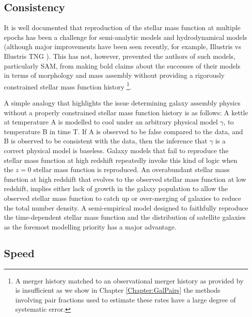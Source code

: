 \subsection{Consistency}
It is well documented that reproduction of the stellar mass function at multiple epochs has been a challenge for semi-analytic models \cite{Knebe2018CosmicModels, Asquith2018CosmicModels} and hydrodynamical models (although major improvements have been seen recently, for example, Illustris vs Illustris TNG \cite{Nelson2015TheRelease, Nelson2019TheRelease}). This has not, however, prevented the authors of such models, particularly SAM, from making bold claims about the successes of their models in terms of morphology and mass assembly without providing a rigorously constrained stellar mass function history \cite[e.g.][]{Somerville2008ANuclei, Hopkins2010MERGERSMATTER}\footnote{A merger history matched to an observational merger history as provided by \citet{Hopkins2010MERGERSMATTER} is insufficient as we show in Chapter \ref{Chapter:GalPairs} the methods involving pair fractions used to estimate these rates have a large degree of systematic error.}. 

A simple analogy that highlights the issue determining galaxy assembly physics without a properly constrained stellar mass function history is as follows: A kettle at temperature A is modelled to cool under an arbitrary physical model $\gamma$, to temperature B in time T. If A is observed to be false compared to the data, and B is observed to be consistent with the data, then the inference that $\gamma$ is a correct physical model is baseless. Galaxy models that fail to reproduce the stellar mass function at high redshift repeatedly invoke this kind of logic when the $z=0$ stellar mass function is reproduced. An overabundant stellar mass function at high redshift that evolves to the observed stellar mass function at low redshift, implies either lack of growth in the galaxy population to allow the observed stellar mass function to catch up or over-merging of galaxies to reduce the total number density. A semi-empirical model designed to faithfully reproduce the time-dependent stellar mass function and the distribution of satellite galaxies as the foremost modelling priority has a major advantage. 

\subsection{Speed}

